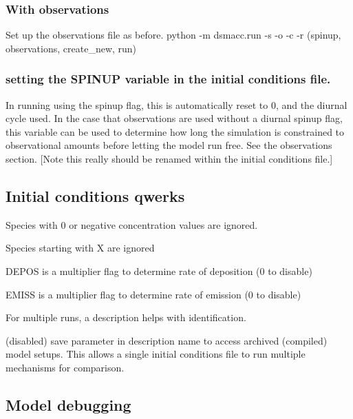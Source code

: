\subsubsection*{With observations}

Set up the observations file as before. {\ttfamily python -\/m dsmacc.\+run -\/s -\/o -\/c -\/r} (spinup, observations, create\+\_\+new, run)

\subsubsection*{setting the \textquotesingle{}S\+P\+I\+N\+UP\textquotesingle{} variable in the initial conditions file.}

In running using the spinup flag, this is automatically reset to 0, and the diurnal cycle used. In the case that observations are used without a diurnal spinup flag, this variable can be used to determine how long the simulation is constrained to observational amounts before letting the model run free. See the observations section. \mbox{[}Note this really should be renamed within the initial conditions file.\mbox{]}

\subsection*{Initial conditions qwerks}


\begin{DoxyItemize}
\item Species with 0 or negative concentration values are ignored.
\item Species starting with X are ignored
\item D\+E\+P\+OS is a multiplier flag to determine rate of deposition (0 to disable)
\item E\+M\+I\+SS is a multiplier flag to determine rate of emission (0 to disable)
\item For multiple runs, a description helps with identification.
\item (disabled) save parameter in description name to access archived (compiled) model setups. This allows a single initial conditions file to run multiple mechanisms for comparison.
\end{DoxyItemize}

\subsection*{Model debugging}

